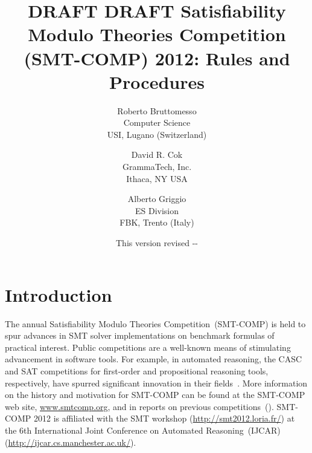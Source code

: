 \documentclass[12pt]{article}
\begin{document}
\date{\small This version revised \the\year-\the\month-\the\day}

\title{DRAFT DRAFT Satisfiability Modulo Theories Competition (SMT-COMP) 2012: Rules and 
Procedures
}

\def\doauthor#1{{%
  \hsize.5\hsize \advance\hsize by-1cm %
  \def\\{\hss\egroup\hbox to\hsize\bgroup\strut\hss}%
  \vbox{\hbox to\hsize\bgroup\strut\hss#1\hss\egroup}}}%

\def\header#1{\medskip\noindent\textbf{#1}}

\author{
Roberto Bruttomesso\\
Computer Science\\
USI, Lugano (Switzerland)
\and
David R. Cok \\
GrammaTech, Inc. \\
Ithaca, NY USA \\
\and
Alberto Griggio\\
ES Division\\
FBK, Trento (Italy)
}

\maketitle

\def\eg{\textit{e.g.}}
\def\ie{\textit{i.e.}}

\section{Introduction}
\label{sec:intro}

The annual Satisfiability Modulo Theories Competition~(SMT-COMP) is
held to spur advances in SMT solver implementations on benchmark
formulas of practical interest.  Public competitions are a well-known
means of stimulating advancement in software tools.  For example, in
automated reasoning, the CASC and SAT competitions for first-order and
propositional reasoning tools, respectively, have spurred significant
innovation in their fields~\cite{PSS02,leberre+03}.  More information
on the history and motivation for SMT-COMP can be found at the
SMT-COMP web site, \url{www.smtcomp.org}, and in reports on previous
competitions~(\cite{SMTCOMP-2008,BDOS08,SMTCOMP-FMSD,SMTCOMP-JAR}).
SMT-COMP 2012 is affiliated with the SMT workshop (\url {http://smt2012.loria.fr/}) at the 6th International
Joint Conference on Automated Reasoning~(IJCAR) (\url{http://ijcar.cs.manchester.ac.uk/}).
\end{document}
